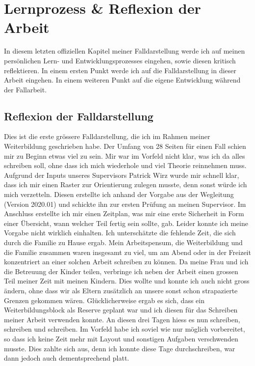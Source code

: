 \section{Lernprozess \& Reflexion der Arbeit}\label{Reflexion}
In diesem letzten offiziellen Kapitel meiner Falldarstellung werde ich auf meinen persönlichen Lern- und Entwicklungsprozesses eingehen, sowie diesen kritisch reflektieren. In einem ersten Punkt werde ich auf die Falldarstellung in dieser Arbeit eingehen. In einem weiteren Punkt auf die eigene Entwicklung während der Fallarbeit.

\subsection{Reflexion der Falldarstellung} \label{sec:reflexionfalldarstellung}
Dies ist die erste grössere Falldarstellung, die ich im Rahmen meiner Weiterbildung geschrieben habe. Der Umfang von 28 Seiten für einen Fall schien mir zu Beginn etwas viel zu sein. Mir war im Vorfeld nicht klar, was ich da alles schreiben soll, ohne dass ich mich wiederhole und viel Theorie reinnehmen muss. Aufgrund der Inputs unseres Supervisors Patrick Wirz wurde mir schnell klar, dass ich mir einen Raster zur Orientierung zulegen musste, denn sonst würde ich mich verzetteln. Diesen erstellte ich anhand der Vorgabe aus der Wegleitung (Version 2020.01) und schickte ihn zur ersten Prüfung an meinen Supervisor. Im Anschluss erstellte ich mir einen Zeitplan, was mir eine erste Sicherheit in Form einer Übersicht, wann welcher Teil fertig sein sollte, gab. Leider konnte ich meine Vorgabe nicht wirklich einhalten. Ich unterschätzte die fehlende Zeit, die sich durch die Familie zu Hause ergab. Mein Arbeitspensum, die Weiterbildung und die Familie zusammen waren insgesamt zu viel, um am Abend oder in der Freizeit konzentriert an einer solchen Arbeit schreiben zu können. Da meine Frau und ich die Betreuung der Kinder teilen, verbringe ich neben der Arbeit einen grossen Teil meiner Zeit mit meinen Kindern. Dies wollte und konnte ich auch nicht gross ändern, ohne dass wir als Eltern zusätzlich an unsere sonst schon strapazierte Grenzen gekommen wären. Glücklicherweise ergab es sich, dass ein Weiterbildungsblock als Reserve geplant war und ich diesen für das Schreiben meiner Arbeit verwenden konnte. An diesen drei Tagen hiess es nun schreiben, schreiben und  schreiben. Im Vorfeld habe ich soviel wie nur möglich vorbereitet, so dass ich keine Zeit mehr mit Layout und sonstigen Aufgaben verschwenden musste. Dies zahlte sich aus, denn ich konnte diese Tage durchschreiben, war dann jedoch auch dementsprechend platt. 


